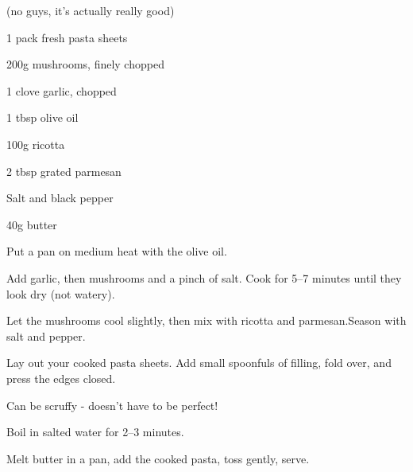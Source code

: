 \label{recipe:panzerotti_fungi}

(no guys, it’s actually really good)

\begin{ingredients}

  \item 1 pack fresh pasta sheets 
  \item 200g mushrooms, finely chopped
  \item 1 clove garlic, chopped
  \item 1 tbsp olive oil
  \item 100g ricotta
  \item 2 tbsp grated parmesan
  \item Salt and black pepper
  \item 40g butter
\end{ingredients}


\begin{method}
Put a pan on medium heat with the olive oil.

Add garlic, then mushrooms and a pinch of salt. Cook for 5–7
minutes until they look dry (not watery).

Let the mushrooms cool slightly, then mix with ricotta and
parmesan.Season with salt and pepper.

Lay out your cooked pasta sheets. Add small spoonfuls of filling,
fold over, and press the edges closed.

Can be scruffy - doesn’t have to be perfect!

Boil in salted water for 2–3 minutes.

Melt butter in a pan, add the cooked pasta, toss gently, serve.
  
\end{method}


